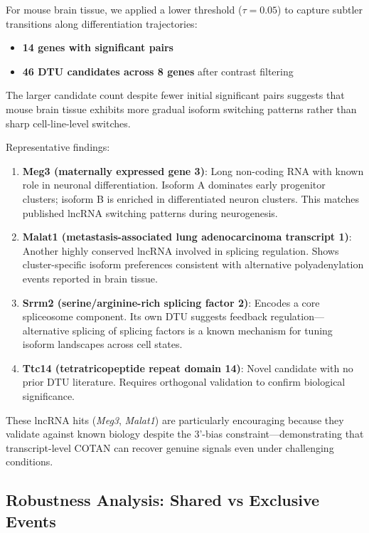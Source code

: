 For mouse brain tissue, we applied a lower threshold ($\tau = 0.05$) to capture subtler transitions along differentiation trajectories:
\begin{itemize}
    \item \textbf{14 genes with significant pairs}
    \item \textbf{46 DTU candidates across 8 genes} after contrast filtering
\end{itemize}

The larger candidate count despite fewer initial significant pairs suggests that mouse brain tissue exhibits more gradual isoform switching patterns rather than sharp cell-line-level switches.

Representative findings:
\begin{enumerate}
    \item \textbf{Meg3 (maternally expressed gene 3)}: Long non-coding RNA with known role in neuronal differentiation. Isoform A dominates early progenitor clusters; isoform B is enriched in differentiated neuron clusters. This matches published lncRNA switching patterns during neurogenesis.
    
    \item \textbf{Malat1 (metastasis-associated lung adenocarcinoma transcript 1)}: Another highly conserved lncRNA involved in splicing regulation. Shows cluster-specific isoform preferences consistent with alternative polyadenylation events reported in brain tissue.

    \item \textbf{Srrm2 (serine/arginine-rich splicing factor 2)}: Encodes a core spliceosome component. Its own DTU suggests feedback regulation---alternative splicing of splicing factors is a known mechanism for tuning isoform landscapes across cell states.

    \item \textbf{Ttc14 (tetratricopeptide repeat domain 14)}: Novel candidate with no prior DTU literature. Requires orthogonal validation to confirm biological significance.
\end{enumerate}

These lncRNA hits (\textit{Meg3}, \textit{Malat1}) are particularly encouraging because they validate against known biology despite the 3'-bias constraint---demonstrating that transcript-level COTAN can recover genuine signals even under challenging conditions.

\subsection*{Robustness Analysis: Shared vs Exclusive Events}\label{sec:robustness}


